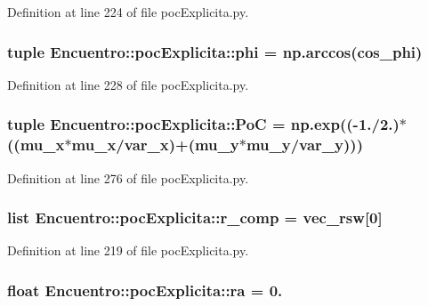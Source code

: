 \-Definition at line 224 of file poc\-Explicita.\-py.

\subsubsection[{phi}]{\setlength{\rightskip}{0pt plus 5cm}tuple {\bf \-Encuentro\-::poc\-Explicita\-::phi} = np.\-arccos({\bf cos\-\_\-phi})}\label{namespace_encuentro_1_1poc_explicita_ab281a7edf7743947b8d936e227f7f0fd}


\-Definition at line 228 of file poc\-Explicita.\-py.

\subsubsection[{\-Po\-C}]{\setlength{\rightskip}{0pt plus 5cm}tuple {\bf \-Encuentro\-::poc\-Explicita\-::\-Po\-C} = np.\-exp((-\/1./2.)$\ast$(({\bf mu\-\_\-x}$\ast${\bf mu\-\_\-x}/{\bf var\-\_\-x})+({\bf mu\-\_\-y}$\ast${\bf mu\-\_\-y}/{\bf var\-\_\-y})))}\label{namespace_encuentro_1_1poc_explicita_a54832d160924f6a2ad26bc221960af11}


\-Definition at line 276 of file poc\-Explicita.\-py.

\subsubsection[{r\-\_\-comp}]{\setlength{\rightskip}{0pt plus 5cm}list {\bf \-Encuentro\-::poc\-Explicita\-::r\-\_\-comp} = vec\-\_\-rsw[0]}\label{namespace_encuentro_1_1poc_explicita_a119646b39dd230d6c8dff5c171732d61}


\-Definition at line 219 of file poc\-Explicita.\-py.

\subsubsection[{ra}]{\setlength{\rightskip}{0pt plus 5cm}float {\bf \-Encuentro\-::poc\-Explicita\-::ra} = 0.}\label{namespace_encuentro_1_1poc_explicita_a3177812fa5ffa001cb39c70755dbb83a}


